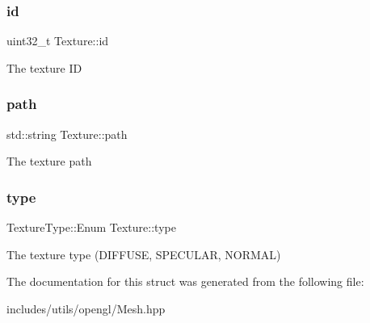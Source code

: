 \subsubsection{\texorpdfstring{id}{id}}
{\footnotesize\ttfamily uint32\+\_\+t Texture\+::id}

The texture ID \mbox{\label{struct_texture_aa8ba4ade408b0df1fc9b6f605a4efd22}} 
\subsubsection{\texorpdfstring{path}{path}}
{\footnotesize\ttfamily std\+::string Texture\+::path}

The texture path \mbox{\label{struct_texture_a789fcb5f3b658f319b53d66da4005b47}} 
\subsubsection{\texorpdfstring{type}{type}}
{\footnotesize\ttfamily Texture\+Type\+::\+Enum Texture\+::type}

The texture type (D\+I\+F\+F\+U\+SE, S\+P\+E\+C\+U\+L\+AR, N\+O\+R\+M\+AL) 

The documentation for this struct was generated from the following file\+:\begin{DoxyCompactItemize}
\item 
includes/utils/opengl/Mesh.\+hpp\end{DoxyCompactItemize}
